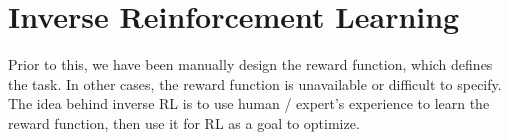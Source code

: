 \chapter{Inverse Reinforcement Learning}

Prior to this, we have been manually design the reward function, which defines the task. In other cases, the reward function is unavailable or difficult to specify. The idea behind inverse \ac{RL} is to use human / expert's experience to learn the reward function, then use it for \ac{RL} as a goal to optimize.